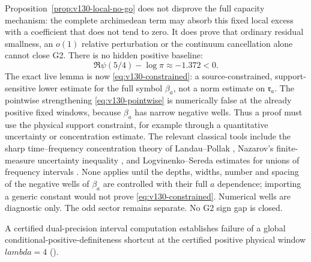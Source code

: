 \documentclass[11pt]{article}
\def\lambda{lambda}%
\theoremstyle{remark}
\begin{document}
Proposition~\ref{prop:v130-local-no-go} does not disprove the full
capacity mechanism: the complete archimedean term may absorb this
fixed local excess with a coefficient that does not tend to zero.
It does prove that ordinary residual smallness, an $o(1)$ relative
perturbation or the continuum cancellation alone cannot close G2.
There is no hidden positive baseline:
\[
 \Re\psi(5/4)-\log\pi\approx-1.372<0.
\]
The exact live lemma is now \eqref{eq:v130-constrained}: a
source-constrained, support-sensitive lower estimate for the full
symbol $\beta_a$, not a norm estimate on $\mathfrak r_a$. The
pointwise strengthening \eqref{eq:v130-pointwise} is numerically false
at the already positive fixed windows, because $\beta_a$ has narrow
negative wells. Thus a proof must use the physical support constraint,
for example through a quantitative uncertainty or concentration
estimate. The relevant classical tools include the sharp
time--frequency concentration theory of Landau--Pollak
\cite{LandauPollak1961}, Nazarov's finite-measure uncertainty
inequality \cite{Nazarov1994}, and Logvinenko--Sereda estimates for
unions of frequency intervals \cite{Kovrijkine2000}. None applies
until the depths, widths, number and spacing of the negative wells of
$\beta_a$ are controlled with their full $a$ dependence; importing a
generic constant would not prove \eqref{eq:v130-constrained}.
Numerical wells are diagnostic only. The odd sector remains separate.
No G2 sign gap is closed.

A certified dual-precision interval computation establishes failure of a global
conditional-positive-definiteness shortcut at the certified positive physical
window $\lambda=4$ ().
\end{document}
